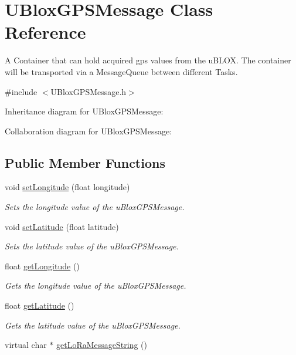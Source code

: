 \hypertarget{class_u_blox_g_p_s_message}{}\section{U\+Blox\+G\+P\+S\+Message Class Reference}
\label{class_u_blox_g_p_s_message}


A Container that can hold acquired gps values from the u\+B\+L\+O\+X. The container will be transported via a Message\+Queue between different Tasks.  




{\ttfamily \#include $<$U\+Blox\+G\+P\+S\+Message.\+h$>$}



Inheritance diagram for U\+Blox\+G\+P\+S\+Message\+:


Collaboration diagram for U\+Blox\+G\+P\+S\+Message\+:
\subsection*{Public Member Functions}
\begin{DoxyCompactItemize}
\item 
void \hyperlink{class_u_blox_g_p_s_message_ab7199f52ae51a5082353ed7b1b28f3c8}{set\+Longitude} (float longitude)
\begin{DoxyCompactList}\small\item\em Sets the longitude value of the u\+Blox\+G\+P\+S\+Message. \end{DoxyCompactList}\item 
void \hyperlink{class_u_blox_g_p_s_message_a634ed37614be2ed636f548476fa57f1e}{set\+Latitude} (float latitude)
\begin{DoxyCompactList}\small\item\em Sets the latitude value of the u\+Blox\+G\+P\+S\+Message. \end{DoxyCompactList}\item 
float \hyperlink{class_u_blox_g_p_s_message_ab3678ddfae0505e177c1eb3c91c69f36}{get\+Longitude} ()
\begin{DoxyCompactList}\small\item\em Gets the longitude value of the u\+Blox\+G\+P\+S\+Message. \end{DoxyCompactList}\item 
float \hyperlink{class_u_blox_g_p_s_message_a70457916dfaa0551946607cd83346645}{get\+Latitude} ()
\begin{DoxyCompactList}\small\item\em Gets the latitude value of the u\+Blox\+G\+P\+S\+Message. \end{DoxyCompactList}\item 
virtual char $\ast$ \hyperlink{class_u_blox_g_p_s_message_a163a535b6947f79ca60e9ccbd10f8327}{get\+Lo\+Ra\+Message\+String} ()
\end{DoxyCompactItemize}


